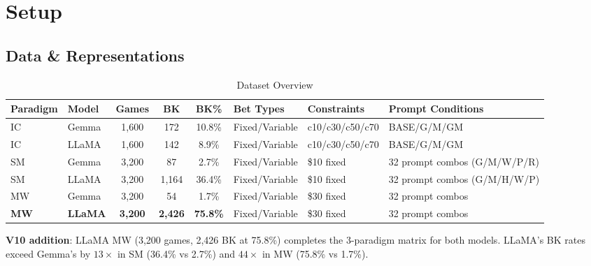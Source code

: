 \documentclass[11pt,a4paper]{article}
\begin{document}
\section{Setup}

\subsection{Data \& Representations}

\begin{table}[H]
\centering
\caption{Dataset Overview}\label{tab:t1}
\footnotesize
\begin{tabular}{llcccllp{3.2cm}}
\toprule
Paradigm & Model & Games & BK & BK\% & Bet Types & Constraints & Prompt Conditions \\
\midrule
IC & Gemma & 1,600 & 172 & 10.8\% & Fixed/Variable & c10/c30/c50/c70 & BASE/G/M/GM \\
IC & LLaMA & 1,600 & 142 & 8.9\% & Fixed/Variable & c10/c30/c50/c70 & BASE/G/M/GM \\
SM & Gemma & 3,200 & 87 & 2.7\% & Fixed/Variable & \$10 fixed & 32 prompt combos (G/M/W/P/R) \\
SM & LLaMA & 3,200 & 1,164 & 36.4\% & Fixed/Variable & \$10 fixed & 32 prompt combos (G/M/H/W/P) \\
MW & Gemma & 3,200 & 54 & 1.7\% & Fixed/Variable & \$30 fixed & 32 prompt combos \\
\textbf{MW} & \textbf{LLaMA} & \textbf{3,200} & \textbf{2,426} & \textbf{75.8\%} & Fixed/Variable & \$30 fixed & 32 prompt combos \\
\bottomrule
\end{tabular}
\end{table}

\noindent\textbf{V10 addition}: LLaMA MW (3,200 games, 2,426 BK at 75.8\%) completes the 3-paradigm matrix for both models. LLaMA's BK rates exceed Gemma's by $13\times$ in SM (36.4\% vs 2.7\%) and $44\times$ in MW (75.8\% vs 1.7\%).
\end{document}
